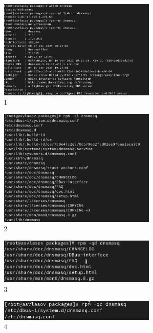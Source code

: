 \documentclass[
  12pt,
  a4paper,
  DIV=11,
  numbers=noendperiod]{scrreprt}
\begin{document}
\begin{figure}

{\centering \includegraphics[width=0.7\textwidth,height=\textheight]{image/20.png}

}

\caption{1}

\end{figure}%
\begin{figure}

{\centering \includegraphics[width=0.7\textwidth,height=\textheight]{image/21.png}

}

\caption{2}

\end{figure}%
\begin{figure}

{\centering \includegraphics[width=0.7\textwidth,height=\textheight]{image/22.png}

}

\caption{3}

\end{figure}%
\begin{figure}

{\centering \includegraphics[width=0.7\textwidth,height=\textheight]{image/23.png}

}

\caption{4}

\end{figure}%
\end{document}
